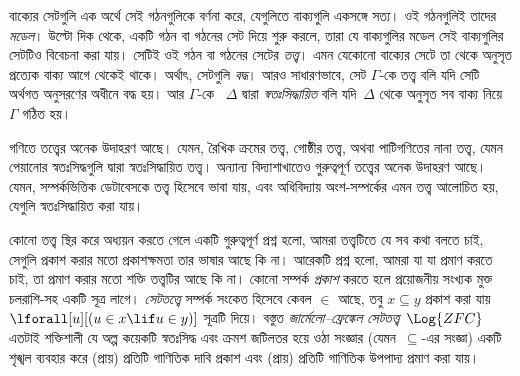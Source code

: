 বাক্যের সেটগুলি এক অর্থে সেই গঠনগুলিকে বর্ণনা করে, যেগুলিতে
বাক্যগুলি একসঙ্গে সত্য। ওই গঠনগুলিই তাদের \emph{মডেল}।
উল্টো দিক থেকে, একটি গঠন বা গঠনের সেট দিয়ে শুরু করলে, তারা
যে বাক্যগুলির মডেল সেই বাক্যগুলির সেটটিও বিবেচনা করা যায়।
সেটিই ওই গঠন বা গঠনের সেটের \emph{তত্ত্ব}। এমন যেকোনো বাক্যের
সেটে তা থেকে অনুসৃত প্রত্যেক বাক্য আগে থেকেই থাকে। অর্থাৎ,
সেটগুলি \emph{বদ্ধ}। আরও সাধারণভাবে, সেট $\Gamma$-কে তত্ত্ব
বলি যদি সেটি অর্থগত অনুসরণের অধীনে বদ্ধ হয়। আর $\Gamma$-কে
~$\Delta$ দ্বারা \emph{স্বতঃসিদ্ধায়িত} বলি যদি~$\Delta$ থেকে
অনুসৃত সব বাক্য নিয়ে~$\Gamma$ গঠিত হয়।

গণিতে তত্ত্বের অনেক উদাহরণ আছে। যেমন, রৈখিক ক্রমের তত্ত্ব,
গোষ্ঠীর তত্ত্ব, অথবা পাটিগণিতের নানা তত্ত্ব, যেমন পেয়ানোর
স্বতঃসিদ্ধগুলি দ্বারা স্বতঃসিদ্ধায়িত তত্ত্ব। অন্যান্য
বিদ্যাশাখাতেও গুরুত্বপূর্ণ তত্ত্বের অনেক উদাহরণ আছে। যেমন,
সম্পর্কভিত্তিক ডেটাবেসকে তত্ত্ব হিসেবে ভাবা যায়, এবং
অধিবিদ্যায় অংশ-সম্পর্কের এমন তত্ত্ব আলোচিত হয়, যেগুলি
স্বতঃসিদ্ধায়িত করা যায়।

কোনো তত্ত্ব স্থির করে অধ্যয়ন করতে গেলে একটি গুরুত্বপূর্ণ
প্রশ্ন হলো, আমরা তত্ত্বটিতে যে সব কথা বলতে চাই, সেগুলি প্রকাশ করার
মতো প্রকাশক্ষমতা তার ভাষার আছে কি না। আরেকটি প্রশ্ন হলো,
আমরা যা যা প্রমাণ করতে চাই, তা প্রমাণ করার মতো শক্তি তত্ত্বটির
আছে কি না। কোনো সম্পর্ক \emph{প্রকাশ} করতে হলে প্রয়োজনীয়
সংখ্যক মুক্ত চলরাশি-সহ একটি সূত্র লাগে। \emph{সেটতত্ত্বে}
সম্পর্ক সংকেত হিসেবে কেবল $\in$ আছে, তবু $x \subseteq y$ প্রকাশ
করা যায় $\lforall[u][(u \in x \lif u \in y)]$ সূত্রটি দিয়ে। বস্তুত
\emph{জার্মেলো--ফ্রেঙ্কেল সেটতত্ত্ব}~$\Log{ZFC}$ এতটাই শক্তিশালী যে
অল্প কয়েকটি স্বতঃসিদ্ধ এবং ক্রমশ জটিলতর হয়ে ওঠা সংজ্ঞার
(যেমন~$\subseteq$-এর সংজ্ঞা) একটি শৃঙ্খল ব্যবহার করে (প্রায়)
প্রতিটি গাণিতিক দাবি প্রকাশ এবং (প্রায়) প্রতিটি গাণিতিক উপপাদ্য
প্রমাণ করা যায়।
